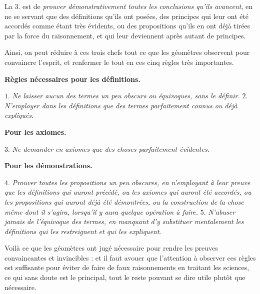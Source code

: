La 3. est de \emph{prouver démonstrativement toutes les conclusions qu'ils avancent}, en ne se servant que des définitions qu'ils ont posées, des principes qui leur ont été accordés comme étant très évidents, ou des propositions qu'ils en ont déjà tirées par la force du raisonnement, et qui leur deviennent après autant de principes.

Ainsi, on peut réduire à ces trois chefs tout ce que les géomètres observent pour convaincre l'esprit, et renfermer le tout en ces cinq règles très importantes.

\begin{center}{\bfseries Règles nécessaires pour les définitions.}\end{center}

$1$.\emph{ Ne laisser aucun des termes un peu obscurs ou équivoques, sans le définir.}
\smallbreak
$2$.\emph{ N'employer dans les définitions que des termes parfaitement connus ou déjà expliqués.}

\begin{center}{\bfseries Pour les axiomes.}\end{center}

$3$.\emph{ Ne demander en axiomes que des choses parfaitement évidentes.}

\begin{center}{\bfseries Pour les démonstrations.}\end{center}

$4$.\emph{ Prouver toutes les propositions un peu obscures, en n'employant à leur preuve que les définitions qui auront précédé, ou les axiomes qui auront été accordés, ou les propositions qui auront déjà été démontrées, ou la construction de la chose même dont il s'agira, lorsqu'il y aura quelque opération à faire.}
\smallbreak
$5$.\emph{ N'abuser jamais de l'équivoque des termes, en manquant d'y substituer mentalement les définitions qui les restreignent et qui les expliquent}.

\bigbreak
Voilà ce que les géomètres ont jugé nécessaire pour rendre les preuves convaincantes et invincibles : et il faut avouer que l'attention à observer ces règles est suffisante pour éviter de faire de faux raisonnements en traitant les sciences, ce qui sans doute est le principal, tout le reste pouvant se dire utile plutôt que nécessaire.


